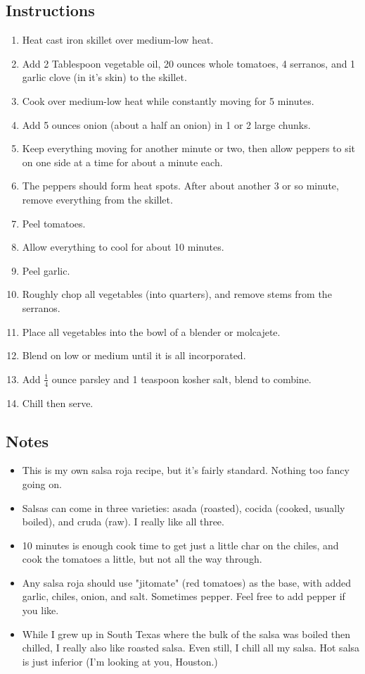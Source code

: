 \begin{multicols}{2}
\subsection*{Instructions}
\begin{enumerate}
    \item Heat cast iron skillet over medium-low heat.
    \item Add 2 Tablespoon vegetable oil, 20 ounces whole tomatoes, 4 serranos, and 1 garlic clove (in it's skin) to the skillet.
    \item Cook over medium-low heat while constantly moving for 5 minutes.
    \item Add 5 ounces onion (about a half an onion) in 1 or 2 large chunks.
    \item Keep everything moving for another minute or two, then allow peppers to sit on one side at a time for about a minute each.
    \item The peppers should form heat spots. After about another 3 or so minute, remove everything from the skillet.
    \item Peel tomatoes.
    \item Allow everything to cool for about 10 minutes.
    \item Peel garlic.
    \item Roughly chop all vegetables (into quarters), and remove stems from the serranos.
    \item Place all vegetables into the bowl of a blender or molcajete.
    \item Blend on low or medium until it is all incorporated.
    \item Add \( \frac{1}{4} \) ounce parsley and 1 teaspoon kosher salt, blend to combine.
    \item Chill then serve.
\end{enumerate}

\subsection*{Notes}
\begin{itemize}
    \item This is my own salsa roja recipe, but it's fairly standard. Nothing too fancy going on.
    \item Salsas can come in three varieties: asada (roasted), cocida (cooked, usually boiled), and cruda (raw). I really like all three.
    \item 10 minutes is enough cook time to get just a little char on the chiles, and cook the tomatoes a little, but not all the way through.
    \item Any salsa roja should use "jitomate" (red tomatoes) as the base, with added garlic, chiles, onion, and salt. Sometimes pepper. Feel free to add pepper if you like.
    \item While I grew up in South Texas where the bulk of the salsa was boiled then chilled, I really also like roasted salsa. Even still, I chill all my salsa. Hot salsa is just inferior (I'm looking at you, Houston.)
\end{itemize}
\end{multicols}
\clearpage